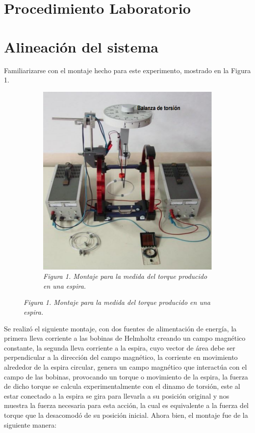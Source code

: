 \section*{Procedimiento Laboratorio}

\section{Alineación del sistema}
Familiarizarse con el montaje hecho para este
experimento, mostrado en la Figura 1.

\begin{figure}[H]
    \centering
    \begin{subfigure}[b]{0.45\textwidth}
        \centering
        \includegraphics[width=\textwidth]{Figures/0. General/1.1.png}
        \caption{\textit{Figura 1. Montaje para la medida del torque producido en una espira.}}
        \label{Figura 1}
    \end{subfigure}
\end{figure}

Se realizó el siguiente montaje, con dos fuentes de alimentación de energía, la
primera lleva corriente a las bobinas de Helmholtz creando un campo magnético
constante, la segunda lleva corriente a la espira, cuyo vector de área debe ser
perpendicular a la dirección del campo magnético, la corriente en movimiento
alrededor de la espira circular, genera un campo magnético que interactúa con
el campo de las bobinas, provocando un torque o movimiento de la espira, la
fuerza de dicho torque se calcula experimentalmente con el dinamo de torsión,
este al estar conectado a la espira se gira para llevarla a su posición
original y nos muestra la fuerza necesaria para esta acción, la cual es
equivalente a la fuerza del torque que la desacomodó de su posición inicial.
Ahora bien, el montaje fue de la siguiente manera:

